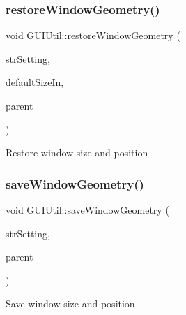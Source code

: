 \subsubsection{\texorpdfstring{restore\+Window\+Geometry()}{restoreWindowGeometry()}}
{\footnotesize\ttfamily void G\+U\+I\+Util\+::restore\+Window\+Geometry (\begin{DoxyParamCaption}\item[{const Q\+String \&}]{str\+Setting,  }\item[{const Q\+Size \&}]{default\+Size\+In,  }\item[{Q\+Widget $\ast$}]{parent }\end{DoxyParamCaption})}

Restore window size and position \mbox{\label{namespace_g_u_i_util_a5bd5d67910917446f2f3aa97d7c8b85a}} 
\subsubsection{\texorpdfstring{save\+Window\+Geometry()}{saveWindowGeometry()}}
{\footnotesize\ttfamily void G\+U\+I\+Util\+::save\+Window\+Geometry (\begin{DoxyParamCaption}\item[{const Q\+String \&}]{str\+Setting,  }\item[{Q\+Widget $\ast$}]{parent }\end{DoxyParamCaption})}

Save window size and position 